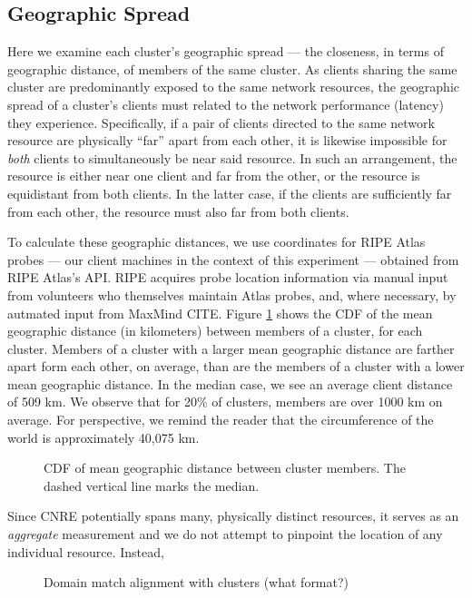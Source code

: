 \subsection{Geographic Spread}
\label{sect:geospread}

Here we examine each cluster's geographic spread --- the closeness, in terms of
geographic distance, of members of the same cluster. As clients sharing the same
cluster are predominantly exposed to the same network resources, the geographic
spread of a cluster's clients must related to the network performance (latency)
they experience. Specifically, if a pair of clients directed
to the same network resource are physically ``far'' apart from each other, it is
likewise impossible for \emph{both} clients to simultaneously be near said
resource. In such an arrangement, the resource is either near one client and far from the other, or the
resource is equidistant from both clients. In the latter case, if the clients
are sufficiently far from each other, the resource must also far from both clients.

To calculate these geographic distances, we use coordinates for RIPE Atlas
probes --- our client machines in the context of this experiment --- obtained
from RIPE Atlas's API. RIPE acquires probe location information via manual input
from volunteers who themselves maintain Atlas probes, and, where necessary, by
autmated input from MaxMind CITE. Figure \ref{geomeans} shows the CDF of the
mean geographic distance (in kilometers) between members of a cluster, for each
cluster. Members of a cluster with a larger mean geographic distance are farther
apart form each other, on average, than are the members of a cluster with a
lower mean geographic distance. In the median case, we see an average client
distance of 509 km. We observe that for 20\% of clusters, members are over 1000
km on average. For perspective, we remind the reader that the circumference of
the world is approximately 40,075 km. 

\begin{figure}
    \caption{CDF of mean geographic distance between
    cluster members. The dashed vertical line marks the median.}
    \label{geomeans}
\end{figure}

Since CNRE potentially spans many, physically distinct resources, it serves as
an \emph{aggregate} measurement and we do not attempt to pinpoint the location
of any individual resource. Instead, 

\begin{figure}
    \caption{Domain match alignment with clusters (what format?)}
    \label{geoperf}
\end{figure}
